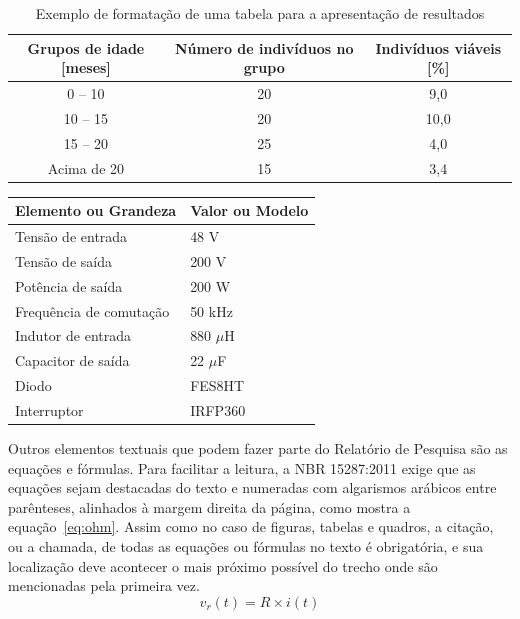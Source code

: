 \documentclass[10pt,a4paper]{article}
\newcommand{\fonte}[1]{\par\vspace{2pt}{\small\singlespacing\raggedright Fonte: #1\par}}
\begin{document}
\begin{table}[htbp]
  \centering\singlespacing
  \begin{minipage}{0.86\textwidth}
    \caption{Exemplo de formatação de uma tabela para a apresentação de resultados}
    \label{tab:exemplo}
    \centering
    \begin{tabular}{ccc}
      \toprule
      \textbf{Grupos de idade [meses]} & \textbf{Número de indivíduos no grupo} & \textbf{Indivíduos viáveis [\%]} \\
      \midrule
      0 -- 10     & 20 & 9,0 \\
      10 -- 15    & 20 & 10,0 \\
      15 -- 20    & 25 & 4,0 \\
      Acima de 20 & 15 & 3,4 \\
      \bottomrule
    \end{tabular}
    \fonte{Produção do(a) próprio(a) autor(a).}
  \end{minipage}
\end{table}

\begin{quadro}[htbp]
  \centering\singlespacing
  \begin{minipage}{0.6\textwidth}
    \caption{Dimensionamento dos elementos de um conversor \textit{boost}}
    \label{qua:boost}
    \centering
    \begin{tabular}{|l|l|}
      \hline
      \textbf{Elemento ou Grandeza} & \textbf{Valor ou Modelo} \\ \hline
      Tensão de entrada        & 48 V \\ \hline
      Tensão de saída          & 200 V \\ \hline
      Potência de saída        & 200 W \\ \hline
      Frequência de comutação  & 50 kHz \\ \hline
      Indutor de entrada       & 880 $\mu$H \\ \hline
      Capacitor de saída       & 22 $\mu$F \\ \hline
      Diodo                    & FES8HT \\ \hline
      Interruptor              & IRFP360 \\ \hline
    \end{tabular}
    \fonte{Menegáz (1997).}
  \end{minipage}
\end{quadro}

Outros elementos textuais que podem fazer parte do Relatório de Pesquisa são as equações e fórmulas. Para facilitar a leitura, a NBR 15287:2011 exige que as equações sejam destacadas do texto e numeradas com algarismos arábicos entre parênteses, alinhados à margem direita da página, como mostra a equação~\eqref{eq:ohm}. Assim como no caso de figuras, tabelas e quadros, a citação, ou a chamada, de todas as equações ou fórmulas no texto é obrigatória, e sua localização deve acontecer o mais próximo possível do trecho onde são mencionadas pela primeira vez.
\begin{equation}
  v_r(t) = R \times i(t)
  \label{eq:ohm}
\end{equation}
\end{document}
